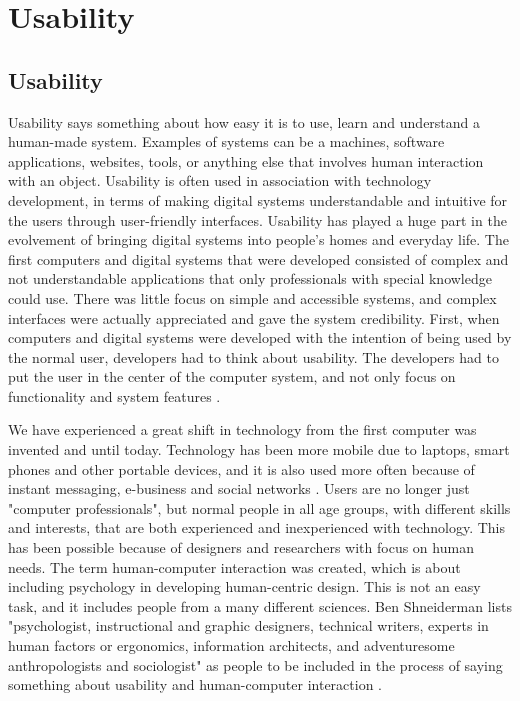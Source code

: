 \chapter{Usability}
\section{Usability}
Usability says something about how easy it is to use, learn and understand a human-made system. Examples of systems can be a machines, software applications, websites, tools, or anything else that involves human interaction with an object. Usability is often used in association with technology development, in terms of making digital systems understandable and intuitive for the users through user-friendly interfaces. Usability has played a huge part in the evolvement of bringing digital systems into people's homes and everyday life. The first computers and digital systems that were developed consisted of complex and not understandable applications that only professionals with special knowledge could use. There was little focus on simple and accessible systems, and complex interfaces were actually appreciated and gave the system credibility. First, when computers and digital systems were developed with the intention of being used by the normal user, developers had to think about usability. The developers had to put the user in the center of the computer system, and not only focus on functionality and system features \cite{mmi}.

We have experienced a great shift in technology from the first computer was invented and until today. Technology has been more mobile due to laptops, smart phones and other portable devices, and it is also used more often because of instant messaging, e-business and social networks \cite{mmi}. Users are no longer just "computer professionals", but normal people in all age groups, with different skills and interests, that are both experienced and inexperienced with technology. This has been possible because of designers and researchers with focus on human needs. The term human-computer interaction was created, which is about including psychology in developing human-centric design. This is not an easy task, and it includes people from a many different sciences. Ben Shneiderman lists "psychologist, instructional and graphic designers, technical writers, experts in human factors or ergonomics, information architects, and adventuresome anthropologists and sociologist" as people to be included in the process of saying something about usability and human-computer interaction \cite{mmi}.  

